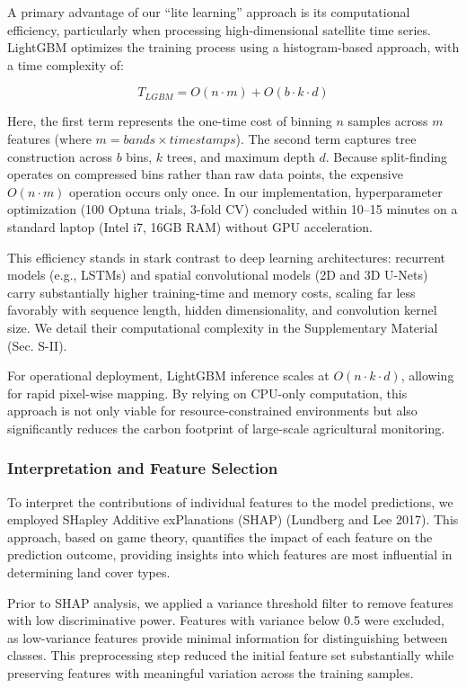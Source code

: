 \documentclass[
  journal,
  twocolumn]{IEEEtran}
\begin{document}
A primary advantage of our ``lite learning'' approach is its
computational efficiency, particularly when processing high-dimensional
satellite time series. LightGBM optimizes the training process using a
histogram-based approach, with a time complexity of:

\[T_{LGBM} = O(n \cdot m) + O(b \cdot k \cdot d)\]

Here, the first term represents the one-time cost of binning \(n\)
samples across \(m\) features (where \(m = bands \times timestamps\)).
The second term captures tree construction across \(b\) bins, \(k\)
trees, and maximum depth \(d\). Because split-finding operates on
compressed bins rather than raw data points, the expensive
\(O(n \cdot m)\) operation occurs only once. In our implementation,
hyperparameter optimization (100 Optuna trials, 3-fold CV) concluded
within 10--15 minutes on a standard laptop (Intel i7, 16GB RAM) without
GPU acceleration.

This efficiency stands in stark contrast to deep learning architectures:
recurrent models (e.g., LSTMs) and spatial convolutional models (2D and
3D U-Nets) carry substantially higher training-time and memory costs,
scaling far less favorably with sequence length, hidden dimensionality,
and convolution kernel size. We detail their computational complexity in
the Supplementary Material (Sec. S-II).

For operational deployment, LightGBM inference scales at
\(O(n \cdot k \cdot d)\), allowing for rapid pixel-wise mapping. By
relying on CPU-only computation, this approach is not only viable for
resource-constrained environments but also significantly reduces the
carbon footprint of large-scale agricultural monitoring.

\hypertarget{interpretation-and-feature-selection}{%
\subsubsection{Interpretation and Feature
Selection}\label{interpretation-and-feature-selection}}

To interpret the contributions of individual features to the model
predictions, we employed SHapley Additive exPlanations (SHAP) (Lundberg
and Lee 2017). This approach, based on game theory, quantifies the
impact of each feature on the prediction outcome, providing insights
into which features are most influential in determining land cover
types.

Prior to SHAP analysis, we applied a variance threshold filter to remove
features with low discriminative power. Features with variance below 0.5
were excluded, as low-variance features provide minimal information for
distinguishing between classes. This preprocessing step reduced the
initial feature set substantially while preserving features with
meaningful variation across the training samples.
\end{document}
